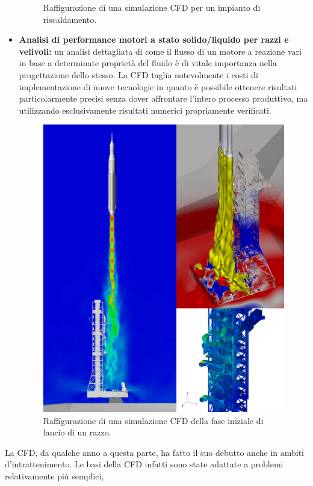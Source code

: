 \begin{itemize}
\begin{figure}[H]
        \caption{Raffigurazione di una simulazione CFD per un impianto di riscaldamento.}
    \end{figure}
    \item \textbf{Analisi di performance motori a stato solido/liquido per razzi e velivoli:} un analisi dettagliata di come il flusso di un motore a reazione vari in base a determinate proprietà
    del fluido è di vitale importanza nella progettazione dello stesso. La CFD taglia notevolmente i costi di implementazione di nuove tecnologie in quanto è possibile ottenere risultati 
    particolarmente precisi senza dover affrontare l'intero processo produttivo, ma utilizzando esclusivamente risultati numerici propriamente verificati.
    \begin{figure}[H]
        \centering
        \includegraphics[width=\linewidth]{figure/rocket.jpg}
        \caption{Raffigurazione di una simulazione CFD della fase iniziale di lancio di un razzo.}
    \end{figure}
\end{itemize}
La CFD, da qualche anno a questa parte, ha fatto il suo debutto anche in ambiti d'intrattenimento. Le basi della CFD infatti sono state adattate a problemi relativamente più semplici, 
